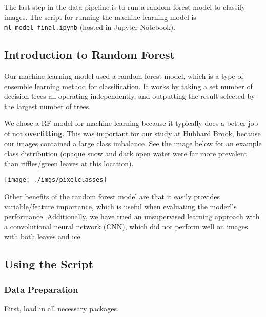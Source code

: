 \documentclass[
]{article}
\begin{document}
The last step in the data pipeline is to run a random forest model to classify images.
The script for running the machine learning model is \texttt{ml\_model\_final.ipynb} (hosted in Jupyter Notebook).

\hypertarget{introduction-to-random-forest}{%
\subsection{Introduction to Random Forest}\label{introduction-to-random-forest}}

Our machine learning model used a random forest model, which is a type of ensemble learning method for classification. It works by taking a set number of decision trees all operating independently, and outputting the result selected by the largest number of trees.

We chose a RF model for machine learning because it typically does a better job of not \textbf{overfitting}. This was important for our study at Hubbard Brook, because our images contained a large class imbalance. See the image below for an example class distribution (opaque snow and dark open water were far more prevalent than riffles/green leaves at this location).

\texttt{[image: ./imgs/pixelclasses]}

Other benefits of the random forest model are that it easily provides variable/feature importance, which is useful when evaluating the moderl's performance. Additionally, we have tried an unsupervised learning approach with a convolutional neural network (CNN), which did not perform well on images with both leaves and ice.

\hypertarget{using-the-script-1}{%
\subsection{Using the Script}\label{using-the-script-1}}

\hypertarget{data-preparation}{%
\subsubsection{Data Preparation}\label{data-preparation}}

First, load in all necessary packages.
\end{document}
